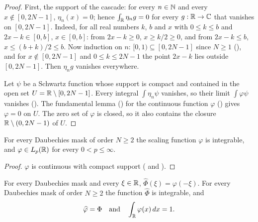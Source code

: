\begin{proof}
\leanok
{}
First, the support of the cascade: for every $n \in \mathbb{N}$ and every $x \notin [0, 2N - 1]$,
$\eta_n(x) = 0$; hence $\int_{\mathbb{R}} \eta_n g = 0$ for every $g : \mathbb{R} \to \mathbb{C}$ that vanishes on
$[0, 2N - 1]$. Indeed, for all real numbers $k$, $b$ and $x$ with $0 \leq k \leq b$ and
$2x - k \in [0, b]$, $x \in [0, b]$: from $2x - k \geq 0$, $x \geq k/2 \geq 0$, and from
$2x - k \leq b$, $x \leq (b + k)/2 \leq b$. Now induction on $n$: $[0, 1) \subseteq [0, 2N - 1]$
since $N \geq 1$ (), and for $x \notin [0, 2N - 1]$ and
$0 \leq k \leq 2N - 1$ the point $2x - k$ lies outside $[0, 2N - 1]$. Then $\eta_n g$ vanishes
everywhere.

Let $\psi$ be a Schwartz function whose support is compact and contained in the open set
$U = \mathbb{R} \setminus [0, 2N - 1]$. Every integral $\int \eta_n \psi$ vanishes, so their limit
$\int \varphi \psi$ vanishes (). The fundamental lemma
() for the continuous function $\varphi$
() gives $\varphi = 0$ on $U$. The zero set of $\varphi$ is
closed, so it also contains the closure $\mathbb{R} \setminus (0, 2N - 1)$ of $U$.
\end{proof}

\begin{proposition}
\label{prop:daub-scaling-integrable}
\leanok
{}
For every Daubechies mask of order $N \geq 2$ the scaling function $\varphi$ is integrable, and
$\varphi \in L_p(\mathbb{R})$ for every $0 < p \leq \infty$.
\end{proposition}

\begin{proof}
\leanok
{}
$\varphi$ is continuous with compact support
( and ).
\end{proof}

\begin{theorem}
\label{thm:daub-scaling-fourier}
\leanok
{}
For every Daubechies mask and every $\xi \in \mathbb{R}$, $\widehat\Phi(\xi) = \varphi(-\xi)$. For
every Daubechies mask of order $N \geq 2$ the function $\widehat\Phi$ is integrable, and
\[
  \widehat\varphi = \Phi \quad\text{and}\quad \int_{\mathbb{R}} \varphi(x) \, dx = 1 .
\]
\end{theorem}

